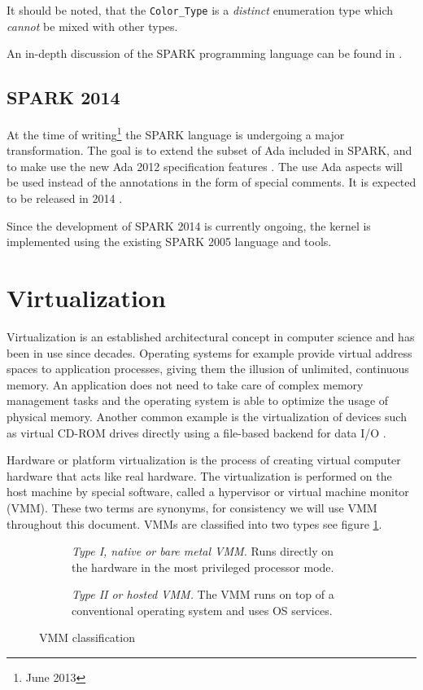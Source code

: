 It should be noted, that the \texttt{Color\_Type} is a \emph{distinct}
enumeration type which \emph{cannot} be mixed with other types.

An in-depth discussion of the SPARK programming language can be found in
\cite{BarnesSPARK}.

\subsection{SPARK 2014}
At the time of writing\footnote{June 2013} the SPARK language is undergoing a
major transformation. The goal is to extend the subset of Ada included in SPARK,
and to make use the new Ada 2012 specification features \cite{Ada2012}. The use
Ada aspects will be used instead of the annotations in the form of special
comments. It is expected to be released in 2014 \cite{SPARK2014:Announcement}.

Since the development of SPARK 2014 is currently ongoing, the kernel is
implemented using the existing SPARK 2005 language and tools.



\section{Virtualization}
Virtualization is an established architectural concept in computer science and
has been in use since decades. Operating systems for example provide virtual
address spaces to application processes, giving them the illusion of unlimited,
continuous memory. An application does not need to take care of complex memory
management tasks and the operating system is able to optimize the usage of
physical memory. Another common example is the virtualization of devices such as
virtual CD-ROM drives directly using a file-based backend for data I/O
\cite{CryptoCloud}.

Hardware or platform virtualization is the process of creating virtual computer
hardware that acts like real hardware. The virtualization is performed on the
host machine by special software, called a hypervisor or
virtual machine monitor (VMM). These two terms are synonyms, for
consistency we will use VMM throughout this document. VMMs are classified into
two types see figure \ref{fig:vmm-classification}.

\begin{figure}
	\centering
	\begin{subfigure}[b]{0.24\textwidth}
		\centering
		
		\caption{\emph{Type I, native or bare metal VMM.} Runs directly on the
		hardware in the most privileged processor mode.}
	\end{subfigure}
	\qquad
	\begin{subfigure}[b]{0.24\textwidth}
		\centering
		
		\caption{\emph{Type II or hosted VMM.} The VMM runs on top of a
		conventional operating system and uses OS services.}
	\end{subfigure}
	\caption{VMM classification}
	\label{fig:vmm-classification}
\end{figure}

